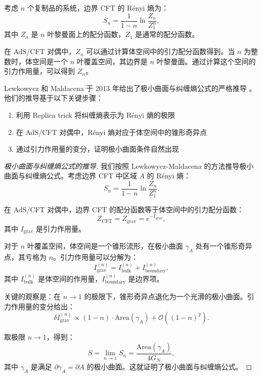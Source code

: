考虑 $n$ 个复制品的系统，边界 CFT 的 Rényi 熵为：
\begin{equation}
    S_n = \frac{1}{1-n} \ln \frac{Z_n}{Z_1^n},
\end{equation}
其中 $Z_n$ 是 $n$ 叶黎曼面上的配分函数，$Z_1$ 是通常的配分函数。

在 AdS/CFT 对偶中，$Z_n$ 可以通过计算体空间中的引力配分函数得到。当 $n$ 为整数时，体空间是一个 $n$ 叶覆盖空间，其边界是 $n$ 叶黎曼面。通过计算这个空间的引力作用量，可以得到 $Z_n$。

\begin{theorem} \label{thm:Lewkowycz}
Lewkowycz 和 Maldacena 于 2013 年给出了极小曲面与纠缠熵公式的严格推导 \cite{Lewkowycz2013}。他们的推导基于以下关键步骤：
\begin{enumerate}
    \item 利用 Replica trick 将纠缠熵表示为 Rényi 熵的极限
    \item 在 AdS/CFT 对偶中，Rényi 熵对应于体空间中的锥形奇异点
    \item 通过引力作用量的变分，证明极小曲面条件自然出现
\end{enumerate}
\end{theorem}

\begin{proof}[极小曲面与纠缠熵公式的推导]
我们按照 Lewkowycz-Maldacena 的方法推导极小曲面与纠缠熵公式。考虑边界 CFT 中区域 $A$ 的 Rényi 熵：
\begin{equation}
    S_n = \frac{1}{1-n} \ln \frac{Z_n}{Z_1^n}.
\end{equation}

在 AdS/CFT 对偶中，边界 CFT 的配分函数等于体空间中的引力配分函数：
\begin{equation}
    Z_{\text{CFT}} = Z_{\text{grav}} = e^{-I_{\text{grav}}},
\end{equation}
其中 $I_{\text{grav}}$ 是引力作用量。

对于 $n$ 叶覆盖空间，体空间是一个锥形流形，在极小曲面 $\gamma_A$ 处有一个锥形奇异点，其亏格为 $n$。引力作用量可以分解为：
\begin{equation}
    I_{\text{grav}}^{(n)} = I_{\text{bulk}}^{(n)} + I_{\text{boundary}}^{(n)},
\end{equation}
其中 $I_{\text{bulk}}^{(n)}$ 是体空间的作用量，$I_{\text{boundary}}^{(n)}$ 是边界项。

关键的观察是：在 $n \to 1$ 的极限下，锥形奇异点退化为一个光滑的极小曲面。引力作用量的变分给出：
\begin{equation}
    \delta I_{\text{grav}}^{(n)} \propto (1-n) \cdot \text{Area}(\gamma_A) + \mathcal{O}\left((1-n)^2\right).
\end{equation}

取极限 $n \to 1$，得到：
\begin{equation}
    S = \lim_{n \to 1} S_n = \frac{\text{Area}(\gamma_A)}{4 G_N},
\end{equation}
其中 $\gamma_A$ 是满足 $\partial \gamma_A = \partial A$ 的极小曲面。这就证明了极小曲面与纠缠熵公式。
\end{proof}

